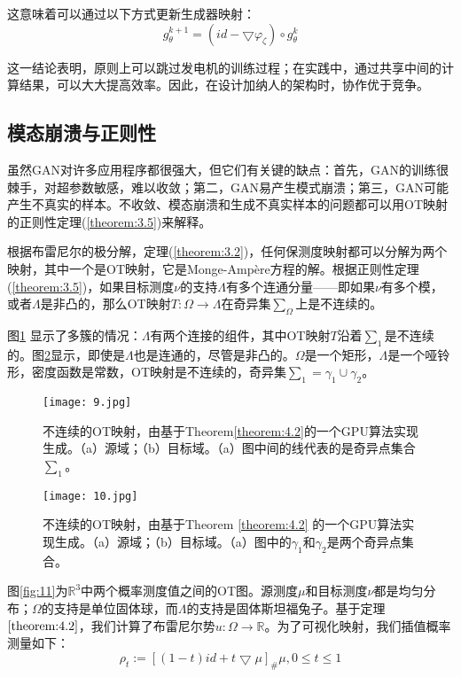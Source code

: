 这意味着可以通过以下方式更新生成器映射：
\begin{equation}
	g_{\theta }^{k+1}=(id-\bigtriangledown \varphi _{\zeta }) \circ g_{\theta }^{k}
	\label{function:33}
\end{equation}

这一结论表明，原则上可以跳过发电机的训练过程；在实践中，通过共享中间的计算结果，可以大大提高效率。因此，在设计加纳人的架构时，协作优于竞争。

\subsection{模态崩溃与正则性}

虽然GAN对许多应用程序都很强大，但它们有关键的缺点：首先，GAN的训练很棘手，对超参数敏感，难以收敛；第二，GAN易产生模式崩溃；第三，GAN可能产生不真实的样本。不收敛、模态崩溃和生成不真实样本的问题都可以用OT映射的正则性定理(\ref{theorem:3.5})来解释。

根据布雷尼尔的极分解，定理(\ref{theorem:3.2})，任何保测度映射都可以分解为两个映射，其中一个是OT映射，它是Monge-Ampère方程的解。根据正则性定理(\ref{theorem:3.5})，如果目标测度$\nu$的支持$\Lambda$有多个连通分量——即如果$\nu$有多个模，或者$\Lambda$是非凸的，那么OT映射$T: \Omega \to \Lambda$在奇异集$\sum _{\Omega}$上是不连续的。

图\ref{fig:9} 显示了多簇的情况：$\Lambda$有两个连接的组件，其中OT映射$T$沿着$\sum_1$是不连续的。图\ref{fig:10}显示，即使是$\Lambda$也是连通的，尽管是非凸的。$\Omega$是一个矩形，$\Lambda$是一个哑铃形，密度函数是常数，OT映射是不连续的，奇异集$\sum_1 = \gamma_1 \cup \gamma_2$。

\begin{figure}[h]
	\centering
	\texttt{[image: 9.jpg]}
	\caption{不连续的OT映射，由基于Theorem\ref{theorem:4.2}的一个GPU算法实现生成。（a）源域；（b）目标域。（a）图中间的线代表的是奇异点集合$\sum_1$。}
	\label{fig:9}
\end{figure}

\begin{figure}[h]
	\centering
	\texttt{[image: 10.jpg]}
	\caption{不连续的OT映射，由基于Theorem \ref{theorem:4.2} 的一个GPU算法实现生成。（a）源域；（b）目标域。（a）图中的$\gamma_1$和$\gamma_2$是两个奇异点集合。}
	\label{fig:10}
\end{figure}

图\ref{fig:11}为$\mathbb{R}^3$中两个概率测度值之间的OT图。源测度$\mu$和目标测度$\nu$都是均匀分布；$\Omega$的支持是单位固体球，而$\Lambda
$的支持是固体斯坦福兔子。基于定理$\ref{theorem:4.2}$，我们计算了布雷尼尔势$u:\Omega \to \mathbb{R}$。为了可视化映射，我们插值概率测量如下：
\begin{equation*}
	\rho _t := \left [ (1-t)id+t\bigtriangledown \mu \right ]_{\#} \mu , 0 \le t \le 1 
\end{equation*}

